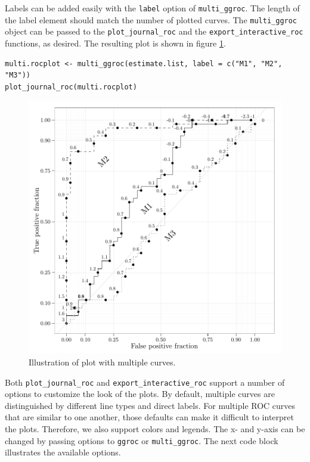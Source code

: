 \documentclass[article]{jss}
\begin{document}
Labels can be added easily with the \texttt{label} option of
\texttt{multi\_ggroc}. The length of the label element should match the
number of plotted curves. The \texttt{multi\_ggroc} object can be passed
to the \texttt{plot\_journal\_roc} and the
\texttt{export\_interactive\_roc} functions, as desired. The resulting
plot is shown in figure \ref{multi}.

\begin{verbatim}
multi.rocplot <- multi_ggroc(estimate.list, label = c("M1", "M2", "M3"))
plot_journal_roc(multi.rocplot)
\end{verbatim}

\begin{figure}[htbp]
\centering
\includegraphics{figure/multi2-1.pdf}
\caption{Illustration of  plot with multiple curves.
\label{multi}}
\end{figure}

Both \texttt{plot\_journal\_roc} and \texttt{export\_interactive\_roc}
support a number of options to customize the look of the plots. By
default, multiple curves are distinguished by different line types and
direct labels. For multiple ROC curves that are similar to one another,
those defaults can make it difficult to interpret the plots. Therefore,
we also support colors and legends. The x- and y-axis can be changed by
passing options to \texttt{ggroc} or \texttt{multi\_ggroc}. The next
code block illustrates the available options.
\end{document}
